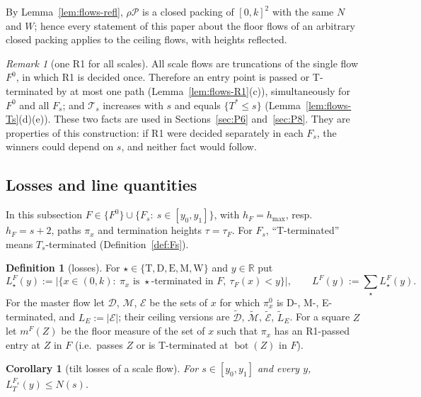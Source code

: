 \documentclass[11pt]{amsart}
\newcommand{\R}{\mathbb R}
\newcommand{\cE}{\mathcal E}
\newcommand{\Bot}{\operatorname{bot}}
\newcommand{\hmax}{h_{\max}}
\newcommand{\Fz}{F^{0}}
\newcommand{\Fs}{F_{s}}
\newcommand{\Tstar}{T^{*}}
\newtheorem{corollary}[theorem]{Corollary}
\theoremstyle{definition}
\newtheorem{definition}[theorem]{Definition}
\theoremstyle{remark}
\newtheorem{remark}[theorem]{Remark}
\numberwithin{equation}{section}
\begin{document}
By Lemma~\ref{lem:flows-refl}, $\rho\mathcal P$ is a closed packing of $[0,k]^2$ with the same $N$ and $W$; hence every
statement of this paper about the floor flows of an arbitrary closed packing applies to the ceiling flows, with heights
reflected.

\begin{remark}[one R1 for all scales]\label{rem:flows-joint}
All scale flows are truncations of the single flow $\Fz$, in which R1 is decided once. Therefore an entry point is
passed or T-terminated by at most one path (Lemma~\ref{lem:flows-R1}(c)), simultaneously for $\Fz$ and all $\Fs$; and
$\mathcal T_s$ increases with $s$ and equals $\{\Tstar\le s\}$ (Lemma~\ref{lem:flows-Ts}(d)(e)). These two facts are used
in Sections~\ref{sec:P6} and~\ref{sec:P8}. They are properties of this construction: if R1 were decided separately in
each $\Fs$, the winners could depend on $s$, and neither fact would follow.
\end{remark}

\subsection{Losses and line quantities}\label{ssec:flows-quantities}

In this subsection $F\in\{\Fz\}\cup\{\Fs:\ s\in[y_0,y_1]\}$, with $h_F=\hmax$, resp.\ $h_F=s+2$, paths $\pi_x$ and
termination heights $\tau=\tau_F$. For $\Fs$, ``T-terminated'' means $T_s$-terminated (Definition~\ref{def:Fs}).

\begin{definition}[losses]\label{def:flows-losses}
For $\star\in\{\mathrm T,\mathrm D,\mathrm E,\mathrm M,\mathrm W\}$ and $y\in\R$ put
\[
L^F_\star(y):=\big|\{x\in(0,k):\ \pi_x\text{ is }\star\text{-terminated in }F,\ \tau_F(x)<y\}\big|,\qquad
L^F(y):=\sum_\star L^F_\star(y).
\]
For the master flow let $\mathcal D$, $\mathcal M$, $\cE$ be the sets of $x$ for which $\pi^0_x$ is D-, M-, E-terminated,
and $L_E:=|\cE|$; their ceiling versions are $\tilde{\mathcal D}$, $\tilde{\mathcal M}$, $\tilde{\cE}$, $\tilde L_E$. For a
square $Z$ let $m^F(Z)$ be the floor measure of the set of $x$ such that $\pi_x$ has an R1-passed entry at $Z$ in $F$
(i.e.\ passes $Z$ or is T-terminated at $\Bot(Z)$ in $F$).
\end{definition}

\begin{corollary}[tilt losses of a scale flow]\label{cor:flows-LT}
For $s\in[y_0,y_1]$ and every $y$, $L^{\Fs}_T(y)\le N(s)$.
\end{corollary}
\end{document}
